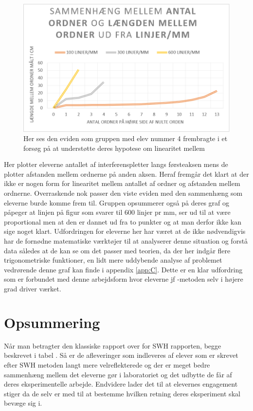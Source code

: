 \begin{figure}[h!]
	\centering
	\includegraphics[width=\textwidth]{Figs/EviJacob}
	\caption{Her ses den eviden som gruppen med elev nummer 4 frembragte i et forsøg på at understøtte deres hypotese om linearitet mellem }
	\label{fig:evidens.jacob}
\end{figure}

Her plotter eleverne antallet af interferenspletter langs førsteaksen mens de plotter afstanden mellem ordnerne på anden aksen. Heraf fremgår det klart at der ikke er nogen form for linearitet mellem antallet af ordner og afstanden mellem ordnerne. Overraskende nok passer den viste eviden med den sammenhæng som eleverne burde komme frem til. Gruppen opsummerer også på deres graf og påpeger at linjen på figur  som svarer til 600 linjer pr mm, ser ud til at være proportional men at den er dannet ud fra to punkter og at man derfor ikke kan sige noget klart. 
Udfordringen for eleverne her har været at de ikke nødvendigvis har de fornødne matematiske værktøjer til at analyserer denne situation og forstå data således at de kan se om det passer med teorien, da der her indgår flere trigonometriske funktioner, en lidt mere uddybende analyse af problemet vedrørende denne graf kan finde i appendix \vref{app:C}. Dette er en klar udfordring som er forbundet med denne arbejdsform hvor eleverne jf \ib-metoden selv i højere grad driver værket. 

\section{Opsummering}
Når man betragter den klassiske rapport over for SWH rapporten, begge beskrevet i tabel . Så er de afleveringer som indleveres af elever som er skrevet efter SWH metoden langt mere velreflekterede og der er meget bedre sammenhæng mellem det eleverne gør i laboratoriet og det udbytte de får af deres eksperimentelle arbejde. Endvidere lader det til at elevernes engagement stiger da de selv er med til at bestemme hvilken retning deres eksperiment skal bevæge sig i.  

